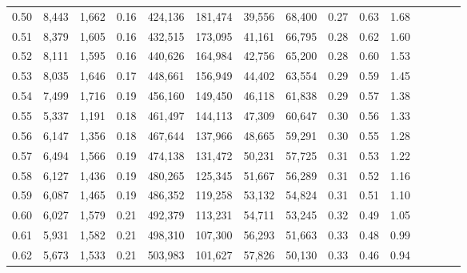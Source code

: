 \begin{tabular}{rrrcrrrrrrrrrrr}
0.50 &   8,443 &  1,662 &                                       0.16 &  424,136 &  181,474 &   39,556 &   68,400 &  0.27 &  0.63 &                         1.68 \\
0.51 &   8,379 &  1,605 &                                       0.16 &  432,515 &  173,095 &   41,161 &   66,795 &  0.28 &  0.62 &                         1.60 \\
0.52 &   8,111 &  1,595 &                                       0.16 &  440,626 &  164,984 &   42,756 &   65,200 &  0.28 &  0.60 &                         1.53 \\
0.53 &   8,035 &  1,646 &                                       0.17 &  448,661 &  156,949 &   44,402 &   63,554 &  0.29 &  0.59 &                         1.45 \\
0.54 &   7,499 &  1,716 &                                       0.19 &  456,160 &  149,450 &   46,118 &   61,838 &  0.29 &  0.57 &                         1.38 \\
0.55 &   5,337 &  1,191 &                                       0.18 &  461,497 &  144,113 &   47,309 &   60,647 &  0.30 &  0.56 &                         1.33 \\
0.56 &   6,147 &  1,356 &                                       0.18 &  467,644 &  137,966 &   48,665 &   59,291 &  0.30 &  0.55 &                         1.28 \\
0.57 &   6,494 &  1,566 &                                       0.19 &  474,138 &  131,472 &   50,231 &   57,725 &  0.31 &  0.53 &                         1.22 \\
0.58 &   6,127 &  1,436 &                                       0.19 &  480,265 &  125,345 &   51,667 &   56,289 &  0.31 &  0.52 &                         1.16 \\
0.59 &   6,087 &  1,465 &                                       0.19 &  486,352 &  119,258 &   53,132 &   54,824 &  0.31 &  0.51 &                         1.10 \\
0.60 &   6,027 &  1,579 &                                       0.21 &  492,379 &  113,231 &   54,711 &   53,245 &  0.32 &  0.49 &                         1.05 \\
0.61 &   5,931 &  1,582 &                                       0.21 &  498,310 &  107,300 &   56,293 &   51,663 &  0.33 &  0.48 &                         0.99 \\
0.62 &   5,673 &  1,533 &                                       0.21 &  503,983 &  101,627 &   57,826 &   50,130 &  0.33 &  0.46 &                         0.94 \\

\end{tabular}
